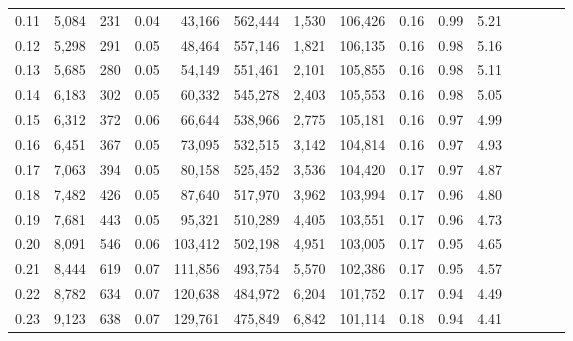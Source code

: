 \begin{tabular}{rrrcrrrrrrrrrrr}
0.11 &   5,084 &    231 &                                       0.04 &   43,166 &  562,444 &    1,530 &  106,426 &  0.16 &  0.99 &                         5.21 \\
0.12 &   5,298 &    291 &                                       0.05 &   48,464 &  557,146 &    1,821 &  106,135 &  0.16 &  0.98 &                         5.16 \\
0.13 &   5,685 &    280 &                                       0.05 &   54,149 &  551,461 &    2,101 &  105,855 &  0.16 &  0.98 &                         5.11 \\
0.14 &   6,183 &    302 &                                       0.05 &   60,332 &  545,278 &    2,403 &  105,553 &  0.16 &  0.98 &                         5.05 \\
0.15 &   6,312 &    372 &                                       0.06 &   66,644 &  538,966 &    2,775 &  105,181 &  0.16 &  0.97 &                         4.99 \\
0.16 &   6,451 &    367 &                                       0.05 &   73,095 &  532,515 &    3,142 &  104,814 &  0.16 &  0.97 &                         4.93 \\
0.17 &   7,063 &    394 &                                       0.05 &   80,158 &  525,452 &    3,536 &  104,420 &  0.17 &  0.97 &                         4.87 \\
0.18 &   7,482 &    426 &                                       0.05 &   87,640 &  517,970 &    3,962 &  103,994 &  0.17 &  0.96 &                         4.80 \\
0.19 &   7,681 &    443 &                                       0.05 &   95,321 &  510,289 &    4,405 &  103,551 &  0.17 &  0.96 &                         4.73 \\
0.20 &   8,091 &    546 &                                       0.06 &  103,412 &  502,198 &    4,951 &  103,005 &  0.17 &  0.95 &                         4.65 \\
0.21 &   8,444 &    619 &                                       0.07 &  111,856 &  493,754 &    5,570 &  102,386 &  0.17 &  0.95 &                         4.57 \\
0.22 &   8,782 &    634 &                                       0.07 &  120,638 &  484,972 &    6,204 &  101,752 &  0.17 &  0.94 &                         4.49 \\
0.23 &   9,123 &    638 &                                       0.07 &  129,761 &  475,849 &    6,842 &  101,114 &  0.18 &  0.94 &                         4.41 \\

\end{tabular}
